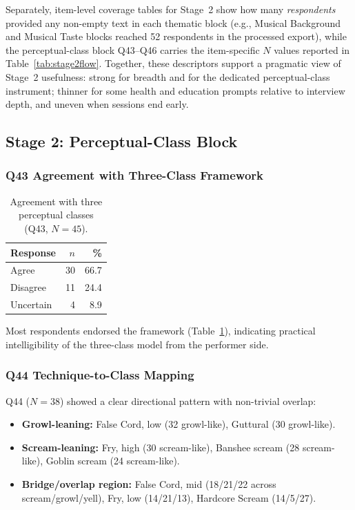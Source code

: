 \documentclass{article}
\begin{document}
Separately, item-level coverage tables for Stage~2 show how many \emph{respondents} provided any non-empty text in each thematic block (e.g., Musical Background and Musical Taste blocks reached 52 respondents in the processed export), while the perceptual-class block Q43--Q46 carries the item-specific \(N\) values reported in Table~\ref{tab:stage2flow}.
Together, these descriptors support a pragmatic view of Stage~2 usefulness: strong for breadth and for the dedicated perceptual-class instrument; thinner for some health and education prompts relative to interview depth, and uneven when sessions end early.

\FloatBarrier
\subsection{Stage 2: Perceptual-Class Block}
\subsubsection{Q43 Agreement with Three-Class Framework}
\begin{table}[ht]
\centering
\caption{Agreement with three perceptual classes (Q43, \(N=45\)).}
\label{tab:q43}
\begin{tabular}{lrr}
\toprule
Response & \(n\) & \% \\
\midrule
Agree & 30 & 66.7 \\
Disagree & 11 & 24.4 \\
Uncertain & 4 & 8.9 \\
\bottomrule
\end{tabular}
\end{table}

Most respondents endorsed the framework (Table~\ref{tab:q43}), indicating practical intelligibility of the three-class model from the performer side.

\subsubsection{Q44 Technique-to-Class Mapping}
Q44 (\(N=38\)) showed a clear directional pattern with non-trivial overlap:
\begin{itemize}
    \item \textbf{Growl-leaning:} False Cord, low (32 growl-like), Guttural (30 growl-like).
    \item \textbf{Scream-leaning:} Fry, high (30 scream-like), Banshee scream (28 scream-like), Goblin scream (24 scream-like).
    \item \textbf{Bridge/overlap region:} False Cord, mid (18/21/22 across scream/growl/yell), Fry, low (14/21/13), Hardcore Scream (14/5/27).
\end{itemize}
\end{document}
